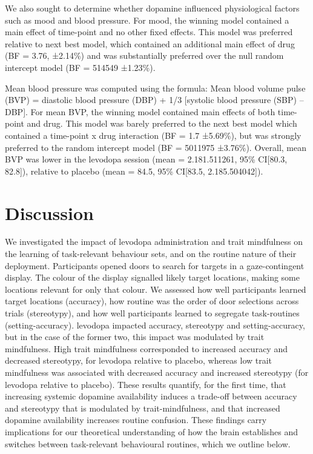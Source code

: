 \documentclass{article}
\begin{document}
We also sought to determine whether dopamine influenced physiological
factors such as mood and blood pressure. For mood, the winning model
contained a main effect of time-point and no other fixed effects. This
model was preferred relative to next best model, which contained an
additional main effect of drug (BF = 3.76, ±2.14\%) and was
substantially preferred over the null random intercept model (BF =
514549 ±1.23\%).

Mean blood pressure was computed using the formula: Mean blood volume
pulse (BVP) = diastolic blood pressure (DBP) + 1/3 {[}systolic blood
pressure (SBP) -- DBP{]}. For mean BVP, the winning model contained main
effects of both time-point and drug. This model was barely preferred to
the next best model which contained a time-point x drug interaction (BF
= 1.7 ±5.69\%), but was strongly preferred to the random intercept model
(BF = 5011975 ±3.76\%). Overall, mean BVP was lower in the levodopa
session (mean = 2.181.511261, 95\% CI{[}80.3, 82.8{]}), relative to
placebo (mean = 84.5, 95\% CI{[}83.5, 2.185.504042{]}).

\hypertarget{discussion}{%
\section{Discussion}\label{discussion}}

We investigated the impact of levodopa administration and trait
mindfulness on the learning of task-relevant behaviour sets, and on the
routine nature of their deployment. Participants opened doors to search
for targets in a gaze-contingent display. The colour of the display
signalled likely target locations, making some locations relevant for
only that colour. We assessed how well participants learned target
locations (accuracy), how routine was the order of door selections
across trials (stereotypy), and how well participants learned to
segregate task-routines (setting-accuracy). levodopa impacted accuracy,
stereotypy and setting-accuracy, but in the case of the former two, this
impact was modulated by trait mindfulness. High trait mindfulness
corresponded to increased accuracy and decreased stereotypy, for
levodopa relative to placebo, whereas low trait mindfulness was
associated with decreased accuracy and increased stereotypy (for
levodopa relative to placebo). These results quantify, for the first
time, that increasing systemic dopamine availability induces a trade-off
between accuracy and stereotypy that is modulated by trait-mindfulness,
and that increased dopamine availability increases routine confusion.
These findings carry implications for our theoretical understanding of
how the brain establishes and switches between task-relevant behavioural
routines, which we outline below.
\end{document}

